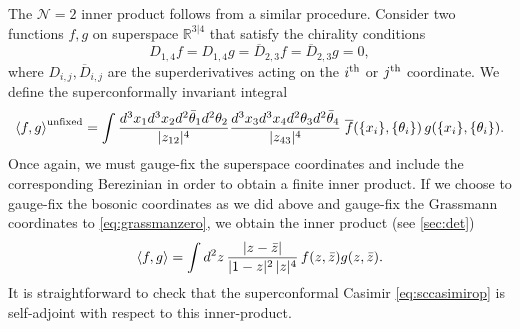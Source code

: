 \documentclass[11pt]{article}
\newcommand{\thetab}{\bar{\theta}}
\newcommand{\zb}{\bar{z}}
\begin{document}
The $\mathcal{N}=2$ inner product follows from a similar procedure. Consider two functions $f,g$ on superspace $\mathbb{R}^{3|4}$ that satisfy the chirality conditions
%
\begin{equation}\label{eq:chiralconds}
D_{1,4}f = D_{1,4}g = \overline{D}_{2,3}f = \overline{D}_{2,3}g = 0,
\end{equation}
%
where $D_{i,j},\overline{D}_{i,j}$ are the superderivatives acting on the $i^{\rm th}$ or $j^{\rm th}$ coordinate. We define the superconformally invariant integral
%
\begin{equation}\label{eq:ip_unfixed}
\expval{ f,g }^{\mathrm{unfixed}} = \int \frac{d^{3}x_{1}d^{3}x_{2}d^{2}\thetab_{1}d^{2}\theta_{2}}{|z_{12}|^{4}}\frac{d^{3}x_{3}d^{3}x_{4}d^{2}\theta_{3}d^{2}\thetab_{4}}{|z_{43}|^{4}}\; \overline{f}(\{x_{i}\},\{\theta_{i}\}) \, g(\{x_{i}\},\{\theta_{i}\}).
\end{equation}
%
Once again, we must gauge-fix the superspace coordinates and include the corresponding Berezinian in order to obtain a finite inner product. If we choose to gauge-fix the bosonic coordinates as we did above and gauge-fix the Grassmann coordinates to \eqref{eq:grassmanzero}, we obtain the inner product  (see \cref{sec:det}) 
%
\begin{equation}\label{eq:ip}
\expval{ f,g } = \int d^{2}z\,\frac{|z-\zb|}{|1-z|^{2} \, |z|^{4}} \,f(z,\zb)g(z,\zb).
\end{equation}
%
It is straightforward to check that the superconformal Casimir \eqref{eq:sccasimirop} is self-adjoint with respect to this inner-product. 
\end{document}
